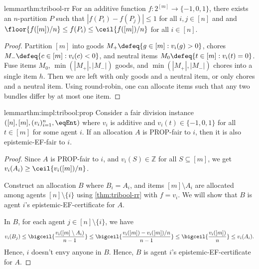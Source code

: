 \begin{restatable}{lemma}{rthm:tribool-rr}
\label{thm:tribool-rr}
For an additive function $f: 2^{[m]} \to \{-1, 0, 1\}$,
there exists an $n$-partition $P$ such that $|f(P_i) - f(P_j)| \le 1$
for all $i, j \in [n]$ and
and $\floor{f([m])/n} \le f(P_i) \le \ceil{f([m])/n}$ for all $i \in [n]$.
\end{restatable}
\begin{proof}
Partition $[m]$ into
goods $M_+ \defeq \{g \in [m]: v_i(g) > 0\}$,
chores $M_- \defeq \{c \in [m]: v_i(c) < 0\}$,
and neutral items $M_0 \defeq \{t \in [m]: v_i(t) = 0\}$.
Fuse items $M_0$, $\min(|M_+|, |M_-|)$ goods, and $\min(|M_+|, |M_-|)$ chores
into a single item $h$.
Then we are left with only goods and a neutral item,
or only chores and a neutral item.
Using round-robin, one can allocate items such that
any two bundles differ by at most one item.
\end{proof}

\begin{restatable}{lemma}{rthm:impl:tribool:prop}
\label{thm:impl:tribool:prop}
Consider a fair division instance $([n], [m], (v_i)_{i=1}^n, \eqEnt)$
where $v_i$ is additive and $v_i(t) \in \{-1, 0, 1\}$ for all $t \in [m]$ for some agent $i$.
If an allocation $A$ is PROP-fair to $i$, then it is also epistemic-EF-fair to $i$.
\end{restatable}
\begin{proof}
Since $A$ is PROP-fair to $i$, and $v_i(S) \in \mathbb{Z}$ for all $S \subseteq [m]$,
we get $v_i(A_i) \ge \ceil{v_i([m])/n}$.

Construct an allocation $B$ where $B_i = A_i$, and items $[m] \setminus A_i$
are allocated among agents $[n] \setminus \{i\}$ using \cref{thm:tribool-rr} with $f = v_i$.
We will show that $B$ is agent $i$'s epistemic-EF-certificate for $A$.

In $B$, for each agent $j \in [n] \setminus \{i\}$, we have
\[ v_i(B_j) \le \bigceil{\frac{v_i([m] \setminus A_i)}{n-1}}
    \le \bigceil{\frac{v_i([m]) - v_i([m])/n}{n-1}}
    \le \bigceil{\frac{v_i([m])}{n}} \le v_i(A_i). \]
Hence, $i$ doesn't envy anyone in $B$.
Hence, $B$ is agent $i$'s epistemic-EF-certificate for $A$.
\end{proof}

